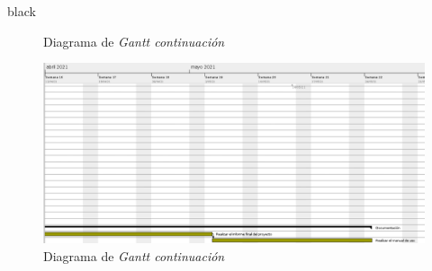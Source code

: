 \documentclass[11pt]{charter}
\begin{document}
\begin{consigna}{black}
\begin{figure}[H]
\caption{Diagrama de \textit{Gantt continuación}}
\label{fig:gant1}
\end{figure}
\begin{figure}[H]
\centering 
\includegraphics[width=1.5\textwidth,angle=-90]{./Figuras/gant8.png}
\caption{Diagrama de \textit{Gantt continuación}}
\label{fig:gant1}
\end{figure}
\end{consigna}
\end{document}
